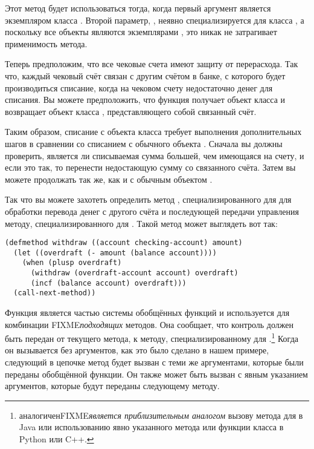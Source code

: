 Этот метод будет использоваться тогда, когда первый аргумент  является
экземпляром класса .  Второй параметр, , неявно
специализируется для класса , а поскольку все объекты являются экземплярами
, это никак не затрагивает применимость метода.

Теперь предположим, что все чековые счета имеют защиту от перерасхода.  Так что, каждый
чековый счёт связан с другим счётом в банке, с которого будет производиться списание,
когда на чековом счету недостаточно денег для списания.  Вы можете предположить, что
функция  получает объект класса  и
возвращает объект класса , представляющего собой связанный счёт.

Таким образом, списание с объекта класса  требует выполнения
дополнительных шагов в сравнении со списанием с обычного объекта .
Сначала вы должны проверить, является ли списываемая сумма большей, чем имеющаяся на
счету, и если это так, то перенести недостающую сумму со связанного счёта.  Затем вы
можете продолжать так же, как и с обычным объектом .

Так что вы можете захотеть определить метод , специализированного для
 для обработки перевода денег с другого счёта и последующей
передачи управления методу, специализированного для .  Такой метод
может выглядеть вот так:

\begin{lstlisting}
(defmethod withdraw ((account checking-account) amount)
  (let ((overdraft (- amount (balance account))))
    (when (plusp overdraft)
      (withdraw (overdraft-account account) overdraft)
      (incf (balance account) overdraft)))
  (call-next-method))
\end{lstlisting}

Функция  является частью системы обобщённых функций и используется
для комбинации FIXME\textit{подходящих} методов.  Она сообщает, что контроль должен быть
передан от текущего метода, к методу, специализированному для
.\footnote{ аналогиченFIXME\textit{является
    приблизительным аналогом} вызову метода для  в Java или использованию явно
  указанного метода или функции класса в Python или C++.}  Когда он вызывается без
аргументов, как это было сделано в нашем примере, следующий в цепочке метод будет вызван с
теми же аргументами, которые были переданы обобщённой функции.  Он также может быть вызван
с явным указанием аргументов, которые будут переданы следующему методу.

